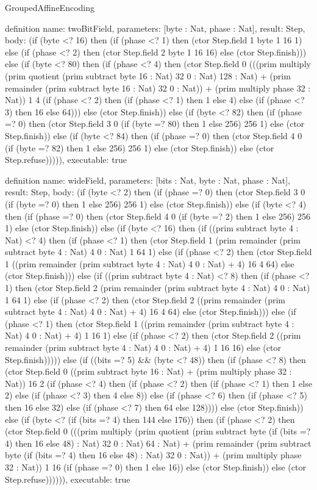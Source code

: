 \begin{lexlean}{GroupedAffineEncoding}
\begin{semanticmodule}
definition{
  name: twoBitField,
  parameters: [byte : Nat, phase : Nat],
  result: Step,
  body: (if (byte <? 16) then (if (phase <? 1) then (ctor Step.field 1 byte 1 16 1) else (if (phase <? 2) then (ctor Step.field 2 byte 1 16 16) else (ctor Step.finish))) else (if (byte <? 80) then (if (phase <? 4) then (ctor Step.field 0 (((prim multiply (prim quotient (prim subtract byte 16 : Nat) 32 0 : Nat) 128 : Nat) + (prim remainder (prim subtract byte 16 : Nat) 32 0 : Nat)) + (prim multiply phase 32 : Nat)) 1 4 (if (phase <? 2) then (if (phase <? 1) then 1 else 4) else (if (phase <? 3) then 16 else 64))) else (ctor Step.finish)) else (if (byte <? 82) then (if (phase =? 0) then (ctor Step.field 3 0 (if (byte =? 80) then 1 else 256) 256 1) else (ctor Step.finish)) else (if (byte <? 84) then (if (phase =? 0) then (ctor Step.field 4 0 (if (byte =? 82) then 1 else 256) 256 1) else (ctor Step.finish)) else (ctor Step.refuse))))),
  executable: true
}

definition{
  name: wideField,
  parameters: [bits : Nat, byte : Nat, phase : Nat],
  result: Step,
  body: (if (byte <? 2) then (if (phase =? 0) then (ctor Step.field 3 0 (if (byte =? 0) then 1 else 256) 256 1) else (ctor Step.finish)) else (if (byte <? 4) then (if (phase =? 0) then (ctor Step.field 4 0 (if (byte =? 2) then 1 else 256) 256 1) else (ctor Step.finish)) else (if (byte <? 16) then (if ((prim subtract byte 4 : Nat) <? 4) then (if (phase <? 1) then (ctor Step.field 1 (prim remainder (prim subtract byte 4 : Nat) 4 0 : Nat) 1 64 1) else (if (phase <? 2) then (ctor Step.field 1 ((prim remainder (prim subtract byte 4 : Nat) 4 0 : Nat) + 4) 16 4 64) else (ctor Step.finish))) else (if ((prim subtract byte 4 : Nat) <? 8) then (if (phase <? 1) then (ctor Step.field 2 (prim remainder (prim subtract byte 4 : Nat) 4 0 : Nat) 1 64 1) else (if (phase <? 2) then (ctor Step.field 2 ((prim remainder (prim subtract byte 4 : Nat) 4 0 : Nat) + 4) 16 4 64) else (ctor Step.finish))) else (if (phase <? 1) then (ctor Step.field 1 ((prim remainder (prim subtract byte 4 : Nat) 4 0 : Nat) + 4) 1 16 1) else (if (phase <? 2) then (ctor Step.field 2 ((prim remainder (prim subtract byte 4 : Nat) 4 0 : Nat) + 4) 1 16 16) else (ctor Step.finish))))) else (if ((bits =? 5) && (byte <? 48)) then (if (phase <? 8) then (ctor Step.field 0 ((prim subtract byte 16 : Nat) + (prim multiply phase 32 : Nat)) 16 2 (if (phase <? 4) then (if (phase <? 2) then (if (phase <? 1) then 1 else 2) else (if (phase <? 3) then 4 else 8)) else (if (phase <? 6) then (if (phase <? 5) then 16 else 32) else (if (phase <? 7) then 64 else 128)))) else (ctor Step.finish)) else (if (byte <? (if (bits =? 4) then 144 else 176)) then (if (phase <? 2) then (ctor Step.field 0 (((prim multiply (prim quotient (prim subtract byte (if (bits =? 4) then 16 else 48) : Nat) 32 0 : Nat) 64 : Nat) + (prim remainder (prim subtract byte (if (bits =? 4) then 16 else 48) : Nat) 32 0 : Nat)) + (prim multiply phase 32 : Nat)) 1 16 (if (phase =? 0) then 1 else 16)) else (ctor Step.finish)) else (ctor Step.refuse)))))),
  executable: true
}


\end{semanticmodule}
\end{lexlean}
